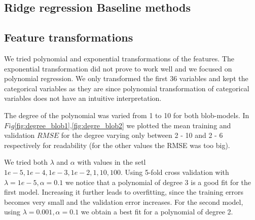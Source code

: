 \documentclass{article} %
\begin{document}
\subsection{Ridge regression Baseline methods}
 

\subsection{Feature transformations}
We tried polynomial and exponential transformations of the features.
The exponential transformation did not prove to work well and we focused on polynomial regression.
We only transformed the first 36 variables and kept the categorical variables as they are since  polynomial transformation of categorical variables does not have an intuitive interpretation. 

The degree of the polynomial was varied from 1 to 10 for both blob-models. In $Fig$\ref{fig:degree_blob1},\ref{fig:degre_blob2} we plotted the mean training and validation $RMSE$ for the degree varying only between 2 - 10 and 2 - 6 respectively for readability (for the other values the RMSE was too big). 

We tried both $\lambda$ and $\alpha$ with values in the setl$1e-5,1e-4,1e-3,1e-2,1,10,100$.
Using 5-fold cross validation with $\lambda = 1e-5, \alpha = 0.1$ we
notice that a polynomial of degree 3 is a good fit for the first model. Increasing it further leads to overfitting, since the training errors becomes very small and the validation error increases. For the second model, using  $\lambda = 0.001, \alpha = 0.1$ we obtain a best fit for a polynomial of degree 2.
\end{document}

